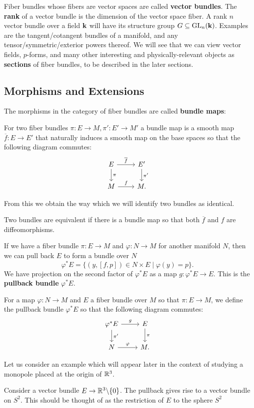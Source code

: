 		Fiber bundles whose fibers are vector spaces are called \textbf{vector bundles}. The \textbf{rank} of a vector bundle is the dimension of the vector space fiber. A rank $n$ vector bundle over a field $\mathbf{k}$ will have its structure group $G \subseteq \mathrm{GL}_n(\mathbf{k})$. Examples are the tangent/cotangent bundles of a manifold, and any tensor/symmetric/exterior powers thereof. We will see that we can view vector fields, $p$-forms, and many other interesting and physically-relevant objects as \textbf{sections} of fiber bundles, to be described in the later sections.
		
		\subsection{Morphisms and Extensions}
		The morphisms in the category of fiber bundles are called \textbf{bundle maps}:
		
		\begin{defn}
			For two fiber bundles $\pi: E \rightarrow M, \pi': E' \rightarrow M'$ a bundle map is a smooth map $\overline f: E \rightarrow E'$ that naturally induces a smooth map on the base spaces so that the following diagram commutes:
			\[
			\begin{tikzcd}
			E \arrow{r}{\overline f} \arrow{d}{\pi} & E' \arrow{d}{\pi'} \\
			M \arrow{r}{f} & M.
			\end{tikzcd}
			\]
		\end{defn}
		From this we obtain the way which we will identify two bundles as identical.
		\begin{defn}
			Two bundles are equivalent if there is a bundle map so that both $\overline f$ and $f$ are diffeomorphisms. 
		\end{defn}
		If we have a fiber bundle $\pi: E \rightarrow M$ and $\varphi: N \rightarrow M$ for another manifold $N$, then we can pull back $E$ to form a bundle over $N$
		\[
			\varphi^* E = \{(y,[f,p]) \in N \times E \mid \varphi(y) = p \}.
		\]
		We have projection on the second factor of $\varphi^* E$ as a map $g: \varphi^* E \rightarrow E$. 
		This is the \textbf{pullback bundle} $\varphi^* E$.
		\begin{defn}
			For a map $\varphi: N \rightarrow M$ and $E$ a fiber bundle over $M$ so that $\pi: E \rightarrow M$, we define the pullback bundle $\varphi^* E$ so that the following diagram commutes:
			\[
			\begin{tikzcd}
			\varphi^* E \arrow{r}{g} \arrow{d}{\pi'} & E \arrow{d}{\pi} \\
			N \arrow{r}{\varphi} & M.
			\end{tikzcd}
			\]
		\end{defn}
		Let us consider an example which will appear later in the context of studying a monopole placed at the origin of $\mathbb{R}^3$.
		\begin{eg}
			Consider a vector bundle $E  \to \mathbb{R}^3 \backslash \{0\}$. The pullback  gives rise to a vector bundle on $S^2$. This should be thought of as the restriction of $E$ to the sphere $S^2$
		\end{eg}
		
